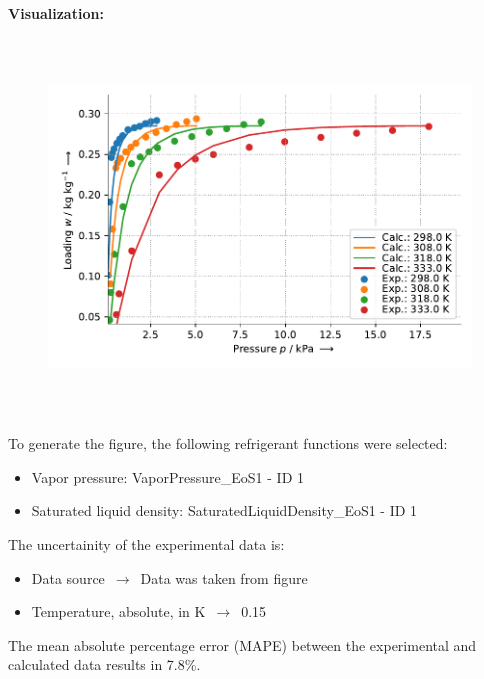 \textbf{Visualization:}
%
\begin{figure}[!htp]
{\noindent\includegraphics[height=10cm, keepaspectratio]{figs/ads/ads_Water_zeotype_pellet_AQSOA-Z02_DubininAstakhov_1.pdf}}
\end{figure}
%

To generate the figure, the following refrigerant functions were selected:
\begin{itemize}
\item Vapor pressure: VaporPressure\_EoS1 - ID 1
\item Saturated liquid density: SaturatedLiquidDensity\_EoS1 - ID 1
\end{itemize}

The uncertainity of the experimental data is:
\begin{itemize}
\item Data source $\,\to\,$ Data was taken from figure
\item Temperature, absolute, in $\si{\kelvin}$ $\,\to\,$ 0.15
\end{itemize}

The mean absolute percentage error (MAPE) between the experimental and calculated data results in 7.8\%.
\FloatBarrier
\newpage
